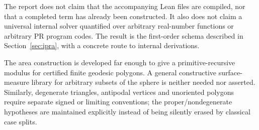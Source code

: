 The report does not claim that the accompanying Lean files are compiled, nor
that a completed  term has already been constructed.  It also
does not claim a universal internal solver quantified over arbitrary
real-number functions or arbitrary PR program codes.  The result is the
first-order schema described in Section~\ref{sec:ipra}, with a concrete route
to internal derivations.

The area construction is developed far enough to give a primitive-recursive
modulus for certified finite geodesic polygons.  A general constructive
surface-measure library for arbitrary subsets of the sphere is neither needed
nor asserted.  Similarly, degenerate triangles, antipodal vertices and
unoriented polygons require separate signed or limiting conventions; the
proper/nondegenerate hypotheses are maintained explicitly instead of being
silently erased by classical case splits.
